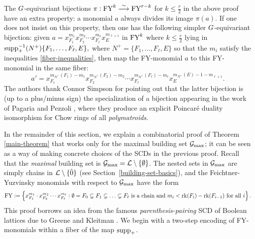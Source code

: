 \begin{remark} \rm
The $G$-equivariant bijections 
$
\pi: \mathrm{FY}^k  \overset{\sim}{\longrightarrow}  \mathrm{FY}^{r-k}
$
for $k \leq \frac{r}{2}$
in the above proof have an extra property:  a monomial $a$ always divides its image $\pi(a)$.  If one does not insist on this property, then
one has the following simpler $G$-equivariant bijection: 
given
$
a=x_{F_1}^{m_1} x_{F_2}^{m_2} \cdots x_{F_\ell}^{m_\ell} x_E^{m_{\ell+1}}
$
in $\mathrm{FY}^k$ 
where $k \leq \frac{r}{2}$
lying in
$
\mathrm{supp}_+^{-1}(N^+)\{F_1,\ldots,F_\ell,E\},
$
where $N^+=
\{F_1,\ldots,F_\ell,E\}
$
so that the $m_i$ satisfy the inequalities \eqref{fiber-inequalities}, then map the FY-monomial $a$ to this 
FY-monomial in the same fiber:
$$
a'=x_{F_1}^{m_{N^+}(F_1)-m_1} x_{F_2}^{m_{N^+}(F_2)-m_2}  \cdots
x_{F_\ell}^{m_{N^+}(F_\ell)-m_\ell} 
x_E^{m_{N^+}(E)-1-m_{\ell+1}}.
$$
The authors thank Connor Simpson for pointing out that the latter bijection is (up to a plus/minus sign) the specialization of a bijection appearing in the work of Pagaria and Pezzoli \cite[Defn.~4.3]{PagariaPezzoli}, where they produce an explicit Poincar\'e duality isomorphism for Chow rings of all {\it polymatroids}.
\end{remark}







In the remainder of this section, we explain
a combinatorial proof of Theorem \ref{main-theorem} that works only for the maximal building set $\mathcal{G}_{\max}$; it can be seen as a way of making concrete choices of the SCDs in the previous proof. Recall that the \textit{maximal} building set is $\mathcal{G}_\text{max} = \mathcal{L} \setminus \{\emptyset\}$. The nested sets in $\mathcal{G}_\text{max}$ are simply chains in $\mathcal{L} \setminus \{\hat{0}\}$ (see Section~\ref{building-set-basics}), and the Feichtner-Yuzvinsky monomials with respect to $\mathcal{G}_\text{max}$ have the form
    \[\mathrm{FY} := \left\{ x_{F_1}^{m_1} \cdot x_{F_2}^{m_2}\cdots x_{F_\ell}^{m_\ell}: \emptyset = F_0 \subsetneq F_1 \subsetneq \ldots \subsetneq F_\ell \text{ is a chain and } m_i < \operatorname{\mathrm{rk}}(F_i) - \operatorname{\mathrm{rk}}(F_{i-1}) \text{ for all } i \right\}.\]
This proof borrows an idea from the famous {\it parenthesis-pairing}
SCD of Boolean lattices due to Greene and Kleitman \cite{GK}.  We begin with a two-step encoding of FY-monomials within a fiber of the map $\mathrm{supp}_+$. 


